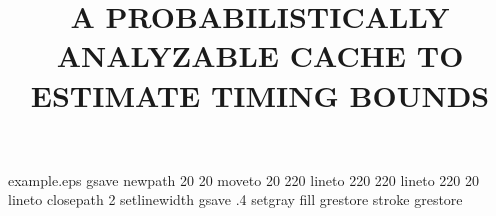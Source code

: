 \begin{filecontents*}{example.eps}
gsave
newpath
  20 20 moveto
  20 220 lineto
  220 220 lineto
  220 20 lineto
closepath
2 setlinewidth
gsave
  .4 setgray fill
grestore
stroke
grestore
\end{filecontents*}
%
\RequirePackage{fix-cm}
%
\documentclass[smallextended]{svjour3}       %
%
\smartqed  %
%
\usepackage{graphicx}
\usepackage{bbding}
\usepackage{graphicx}
\usepackage[cmex10]{amsmath}
\usepackage{array}
\usepackage[hyphens]{url}
\usepackage{hyperref}
\usepackage{fixltx2e}



\usepackage{booktabs}
\usepackage{mdwlist}
\usepackage[comma,numbers,compress,square]{natbib}
\usepackage{pgfplots}
\usepackage{placeins}
\usepackage{xspace}
\usepackage{algpseudocode}
\usepackage{algorithm}
\usepackage{paralist}
\usepackage{wasysym}
\usepackage{comment}
\usepackage{color}
\usepackage{leading}
\usepackage{filecontents}
\usepackage{verbatim}
\usepackage{balance}
\usepackage{tikz}
\usepackage{pgf}
\usepackage{xxcolor}
\usepackage[colorinlistoftodos]{todonotes}
\usepackage{amssymb,amsmath}
\usepackage{pgfgantt}
%
%
%
%


\title{A PROBABILISTICALLY ANALYZABLE CACHE TO ESTIMATE TIMING BOUNDS%
}

